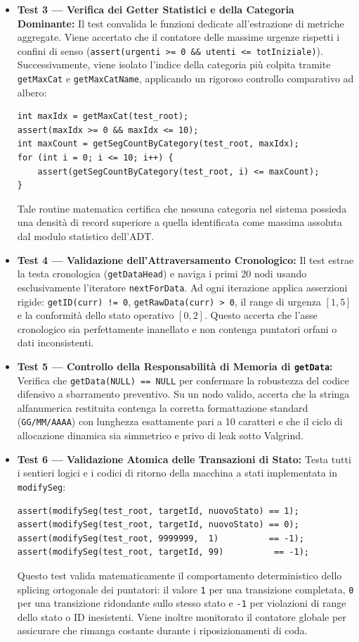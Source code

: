 \documentclass[12pt, a4paper]{article}
\begin{document}
\begin{itemize}[leftmargin=*]
    \item \textbf{Test 3 --- Verifica dei Getter Statistici e della Categoria Dominante:} Il test convalida le funzioni dedicate all'estrazione di metriche aggregate. Viene accertato che il contatore delle massime urgenze rispetti i confini di senso (\texttt{assert(urgenti >= 0 \&\& utenti <= totIniziale)}). Successivamente, viene isolato l'indice della categoria più colpita tramite \texttt{getMaxCat} e \texttt{getMaxCatName}, applicando un rigoroso controllo comparativo ad albero:
\begin{lstlisting}[style=cstyle, numbers=none]
int maxIdx = getMaxCat(test_root);
assert(maxIdx >= 0 && maxIdx <= 10);
int maxCount = getSegCountByCategory(test_root, maxIdx);
for (int i = 0; i <= 10; i++) {
    assert(getSegCountByCategory(test_root, i) <= maxCount);
}
\end{lstlisting}
    Tale routine matematica certifica che nessuna categoria nel sistema possieda una densità di record superiore a quella identificata come massima assoluta dal modulo statistico dell'ADT.
    
    \item \textbf{Test 4 --- Validazione dell'Attraversamento Cronologico:} Il test estrae la testa cronologica (\texttt{getDataHead}) e naviga i primi 20 nodi usando esclusivamente l'iteratore \texttt{nextForData}. Ad ogni iterazione applica asserzioni rigide: \texttt{getID(curr) != 0}, \texttt{getRawData(curr) > 0}, il range di urgenza $[1, 5]$ e la conformità dello stato operativo $[0, 2]$. Questo accerta che l'asse cronologico sia perfettamente inanellato e non contenga puntatori orfani o dati inconsistenti.
    
    \item \textbf{Test 5 --- Controllo della Responsabilità di Memoria di \texttt{getData}:} Verifica che \texttt{getData(NULL) == NULL} per confermare la robustezza del codice difensivo a sbarramento preventivo. Su un nodo valido, accerta che la stringa alfanumerica restituita contenga la corretta formattazione standard (\texttt{GG/MM/AAAA}) con lunghezza esattamente pari a 10 caratteri e che il ciclo di allocazione dinamica sia simmetrico e privo di leak sotto Valgrind.
    
    \item \textbf{Test 6 --- Validazione Atomica delle Transazioni di Stato:} Testa tutti i sentieri logici e i codici di ritorno della macchina a stati implementata in \texttt{modifySeg}:
\begin{lstlisting}[style=cstyle, numbers=none]
assert(modifySeg(test_root, targetId, nuovoStato) == 1);
assert(modifySeg(test_root, targetId, nuovoStato) == 0);
assert(modifySeg(test_root, 9999999,  1)          == -1);
assert(modifySeg(test_root, targetId, 99)          == -1);
\end{lstlisting}
    Questo test valida matematicamente il comportamento deterministico dello splicing ortogonale dei puntatori: il valore \texttt{1} per una transizione completata, \texttt{0} per una transizione ridondante sullo stesso stato e \texttt{-1} per violazioni di range dello stato o ID inesistenti. Viene inoltre monitorato il contatore globale per assicurare che rimanga costante durante i riposizionamenti di coda.
    

\end{itemize}
\end{document}
